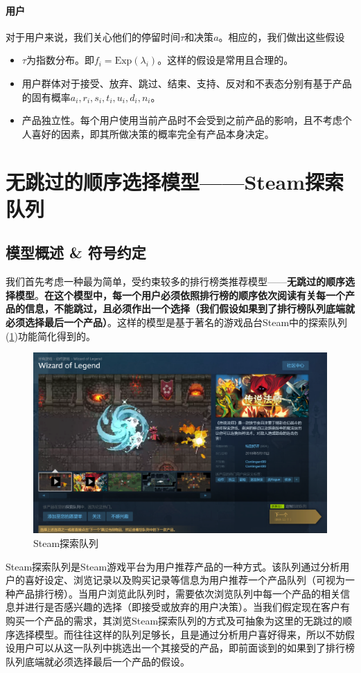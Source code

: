 \documentclass[UTF8]{ctexart}
\theoremstyle{plain}
\theoremstyle{definition}
\theoremstyle{remark}
\begin{document}
	\paragraph{用户} 对于用户来说，我们关心他们的停留时间$\tau$和决策$a$。相应的，我们做出这些假设
	\begin{itemize}
		\item $\tau$为指数分布。即$f_i = \mathrm{Exp}(\lambda_i)$。这样的假设是常用且合理的。
		\item 用户群体对于接受、放弃、跳过、结束、支持、反对和不表态分别有基于产品的固有概率$a_i,r_i,s_i,t_i,u_i,d_i,n_i$。
		\item 产品独立性。每个用户使用当前产品时不会受到之前产品的影响，且不考虑个人喜好的因素，即其所做决策的概率完全有产品本身决定。
	\end{itemize}
	
	\section{无跳过的顺序选择模型——Steam探索队列}
	\subsection{模型概述 \& 符号约定}
	我们首先考虑一种最为简单，受约束较多的排行榜类推荐模型——\textbf{无跳过的顺序选择模型}。\textbf{在这个模型中，每一个用户必须依照排行榜的顺序依次阅读有关每一个产品的信息，不能跳过，且必须作出一个选择（我们假设如果到了排行榜队列底端就必须选择最后一个产品）}。这样的模型是基于著名的游戏品台Steam中的探索队列(\ref{modelA_fig_1})功能简化得到的。
	\begin{figure}[h!]
		\centering
		\includegraphics[width = 12cm]{modelA_fig_1.png}
		\caption{Steam探索队列}\label{modelA_fig_1}
	\end{figure}
	Steam探索队列是Steam游戏平台为用户推荐产品的一种方式。该队列通过分析用户的喜好设定、浏览记录以及购买记录等信息为用户推荐一个产品队列（可视为一种产品排行榜）。当用户浏览此队列时，需要依次浏览队列中每一个产品的相关信息并进行是否感兴趣的选择（即接受或放弃的用户决策）。当我们假定现在客户有购买一个产品的需求，其浏览Steam探索队列的方式及可抽象为这里的无跳过的顺序选择模型。而往往这样的队列足够长，且是通过分析用户喜好得来，所以不妨假设用户可以从这一队列中挑选出一个其接受的产品，即前面谈到的如果到了排行榜队列底端就必须选择最后一个产品的假设。 \\
	
\end{document}
